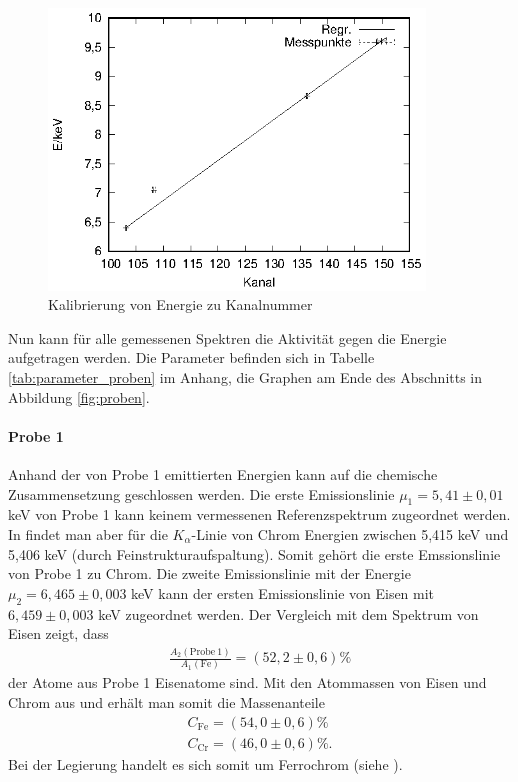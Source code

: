 \begin{figure}[h]
  \centering
  \includegraphics[width=10cm]{data/Massenanteil/kalibrierung.eps}
  \caption{Kalibrierung von Energie zu Kanalnummer}
  \label{fig:kalibrierung}
\end{figure}

Nun kann für alle gemessenen Spektren die Aktivität gegen die Energie aufgetragen werden. Die Parameter befinden sich in Tabelle \ref{tab:parameter_proben} im Anhang, die Graphen am Ende des Abschnitts in Abbildung \ref{fig:proben}.

\paragraph{Probe 1}
Anhand der von Probe 1 emittierten Energien kann auf die chemische Zusammensetzung geschlossen werden. Die erste Emissionslinie $\mu_1=5,41 \pm 0,01$ keV von Probe 1 kann keinem vermessenen Referenzspektrum zugeordnet werden. In \cite{booklet} findet man aber für die $K_\alpha$-Linie von Chrom Energien zwischen 5,415 keV und 5,406 keV (durch Feinstrukturaufspaltung). Somit gehört die erste Emssionslinie von Probe 1 zu Chrom. Die zweite Emissionslinie mit der Energie $\mu_2=6,465 \pm 0,003$ keV kann der ersten Emissionslinie von Eisen mit $6,459 \pm 0,003$ keV zugeordnet werden. Der Vergleich mit dem Spektrum von Eisen zeigt, dass 
\begin{align*}
  \frac{A_2(\mathrm{Probe \ 1})}{A_1(\mathrm{Fe})}=(52,2 \pm 0,6) \%
\end{align*}
der Atome aus Probe 1 Eisenatome sind. Mit den Atommassen von Eisen und Chrom aus \cite{fe} und \cite{cr} erhält man somit die Massenanteile
\begin{align*}
  C_\mathrm{Fe}=(54,0 \pm 0,6) \% \\
  C_\mathrm{Cr}=(46,0 \pm 0,6) \%.
\end{align*}
Bei der Legierung handelt es sich somit um Ferrochrom (siehe \cite{legierung}).

